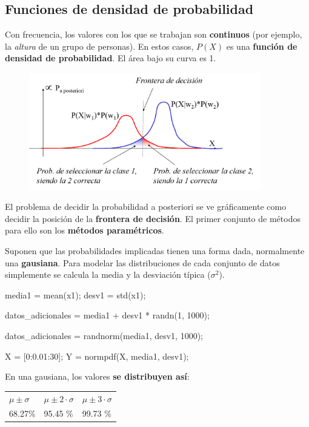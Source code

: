\documentclass[11pt]{scrartcl}
\begin{document}
\subsection{Funciones de densidad de probabilidad}

Con frecuencia, los valores con los que se trabajan son \textbf{continuos} (por
ejemplo, la \textit{altura} de un grupo de personas). En estos casos, $P(X)$ es
una \textbf{función de densidad de probabilidad}. El área bajo su curva es 1.

\begin{figure}[h!]
  \centering
  \includegraphics[width=0.9\textwidth]{img/bayes3}
\end{figure}

El problema de decidir la probabilidad a posteriori se ve gráficamente como
decidir la posición de la \textbf{frontera de decisión}. El primer conjunto de
métodos para ello son los \textbf{métodos paramétricos}. 

Suponen que las probabilidades implicadas tienen una forma dada, normalmente una
\textbf{gausiana}. Para modelar las distribuciones de cada conjunto de datos
simplemente se calcula la media y la desviación típica ($\sigma^2$).

\begin{matlabcode}
media1 = mean(x1);
desv1 = std(x1);

datos_adicionales = media1 + desv1 * randn(1, 1000);  

datos_adicionales = randnorm(media1, desv1, 1000);

X = [0:0.01:30];
Y = normpdf(X, media1, desv1);
\end{matlabcode}

\begin{framed}
En una gausiana, los valores \textbf{se distribuyen así}:

\begin{center}
  \begin{tabularx}{\textwidth}{X X X}
    $\mu \pm \sigma$ & $\mu \pm 2 \cdot \sigma$ & $\mu \pm 3 \cdot \sigma$ \\
    68.27\% & 95.45 \% & 99.73 \%
  \end{tabularx}
\end{center}

\end{framed}
\end{document}
